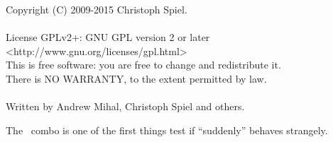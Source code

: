 \begin{exemplar}[htbp]
\begin{maxipage}
\begin{terminal}
      Copyright (C) 2009-2015 Christoph Spiel. \\
      ~ \\
      License GPLv2+: GNU GPL version 2 or later <http://www.gnu.org/licenses/gpl.html> \\
      This is free software: you are free to change and redistribute it. \\
      There is NO WARRANTY, to the extent permitted by law. \\
      ~ \\
      Written by Andrew Mihal, Christoph Spiel and others.
    \end{terminal}
  \end{maxipage}

  \caption[Output of ]%
           {Example output of \appcmd{} when called with options
             and~
            together.\label{ex:option-version-verbose}}
\end{exemplar}

The ~combo is one of the first things test
if \appcmd{} ``suddenly'' behaves strangely.

